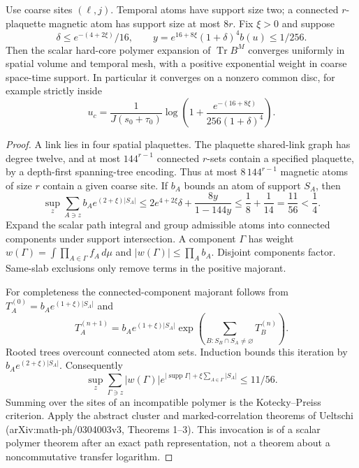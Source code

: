 \begin{proposition}
\label{prop:wdt-polymer-criterion}
Use coarse sites $(\ell,j)$. Temporal atoms have support size two;
a connected $r$-plaquette magnetic atom has support size at most $8r$.
Fix $\xi>0$ and suppose
\[
 \delta\le e^{-(4+2\xi)}/16,\qquad
 y=e^{16+8\xi}(1+\delta)^4b(u)\le1/256.
\]
Then the scalar hard-core polymer expansion of $\operatorname{Tr}B^M$
converges uniformly in spatial volume and temporal mesh, with a positive
exponential weight in coarse space-time support. In particular it converges
on a nonzero common disc, for example strictly inside
\[
 u_c=\frac1{J(s_0+\tau_0)}
 \log\!\left(1+\frac{e^{-(16+8\xi)}}{256(1+\delta)^4}\right).
\]
\end{proposition}
\begin{proof}
A link lies in four spatial plaquettes. The plaquette shared-link graph
has degree twelve, and at most $144^{r-1}$ connected $r$-sets contain a
specified plaquette, by a depth-first spanning-tree encoding.
Thus at most $8\,144^{r-1}$ magnetic atoms of size $r$ contain a given
coarse site. If $b_A$ bounds an atom of support $S_A$, then
\[
 \sup_z\sum_{A\ni z}b_Ae^{(2+\xi)|S_A|}
 \le 2e^{4+2\xi}\delta+\frac{8y}{1-144y}
 \le\frac18+\frac1{14}=\frac{11}{56}<\frac14.
\]
Expand the scalar path integral and group admissible atoms into connected
components under support intersection. A component $\Gamma$ has weight
$w(\Gamma)=\int\prod_{A\in\Gamma}f_A\,d\mu$ and
$|w(\Gamma)|\le\prod_A b_A$. Disjoint components factor. Same-slab
exclusions only remove terms in the positive majorant.

For completeness the connected-component majorant follows from
$T_A^{(0)}=b_Ae^{(1+\xi)|S_A|}$ and
\[
 T_A^{(n+1)}=b_Ae^{(1+\xi)|S_A|}
       \exp\!\left(\sum_{B:S_B\cap S_A\ne\varnothing}T_B^{(n)}\right).
\]
Rooted trees overcount connected atom sets. Induction bounds this iteration
by $b_Ae^{(2+\xi)|S_A|}$. Consequently
\[
 \sup_z\sum_{\Gamma\ni z}|w(\Gamma)|
 e^{|\operatorname{supp}\Gamma|+\xi\sum_{A\in\Gamma}|S_A|}
 \le11/56.
\]
Summing over the sites of an incompatible polymer is the
Kotecky--Preiss criterion. Apply the abstract cluster and marked-correlation
theorems of Ueltschi (arXiv:math-ph/0304003v3, Theorems 1--3).
This invocation is of a scalar polymer theorem after an exact path
representation, not a theorem about a noncommutative transfer logarithm.
\end{proof}

